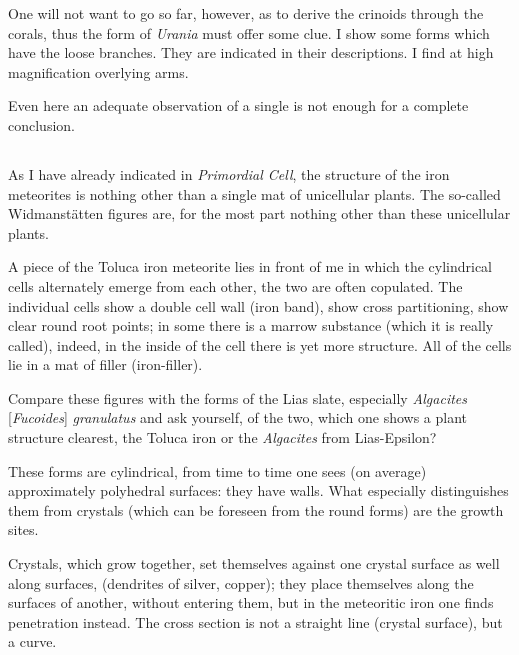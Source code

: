 \documentclass[a4paper, 12pt, oneside]{article}
\begin{document}
One will not want to go so far, however, as to derive the crinoids through the corals, thus the form of \emph{Urania} must offer some clue. I show some forms which have the loose branches. They are indicated in their descriptions. I find at high magnification overlying arms.

Even here an adequate observation of a single is not enough for a complete conclusion.
\clearpage
\subsection{}
\paragraph*{}
As I have already indicated in \emph{Primordial Cell}, the structure of the iron meteorites is nothing other than a single mat of unicellular plants. The so-called Widmanstätten figures are, for the most part nothing other than these unicellular plants.

A piece of the Toluca iron meteorite lies in front of me in which the cylindrical cells alternately emerge from each other, the two are often copulated. The individual cells show a double cell wall (iron band), show cross partitioning, show clear round root points; in some there is a marrow substance (which it is really called), indeed, in the inside of the cell there is yet more structure. All of the cells lie in a mat of filler (iron-filler).

Compare these figures with the forms of the Lias slate, especially \emph{Algacites} [\emph{Fucoides}] \emph{granulatus} and ask yourself, of the two, which one shows a plant structure clearest, the Toluca iron or the \emph{Algacites} from Lias-Epsilon?

These forms are cylindrical, from time to time one sees (on average) approximately polyhedral surfaces: they have walls. What especially distinguishes them from crystals (which can be foreseen from the round forms) are the growth sites.

Crystals, which grow together, set themselves against one crystal surface as well along surfaces, (dendrites of silver, copper); they place themselves along the surfaces of another, without entering them, but in the meteoritic iron one finds penetration instead. The cross section is not a straight line (crystal surface), but a curve.
\end{document}
